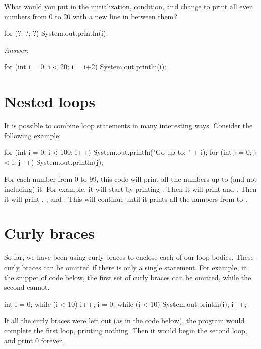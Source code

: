 \begin{example}
What would you put in the initialization, condition, and change to print all
even numbers from 0 to 20 with a new line in between them?

\begin{code}
for (?; ?; ?)
{
    System.out.println(i);
}
\end{code}

\emph{Answer}:
\begin{code}
for (int i = 0; i < 20; i = i+2)
{
    System.out.println(i);
}
\end{code}
\end{example}

\section{Nested loops}
It is possible to combine loop statements in many interesting ways. Consider the following example:

\begin{code}
for (int i = 0; i < 100; i++)
{
    System.out.println("Go up to: " + i);
    for (int j = 0; j < i; j++)
    {
        System.out.println(j);
    }
}
\end{code}

\noindent For each number from 0 to 99, this code will print all the numbers up
to (and not including) it.  For example, it will start by printing . Then it will print 
and .  Then it will print , , and .  This will continue
until it prints all the numbers from  to .

\section{Curly braces}
So far, we have been using curly braces to enclose each of our loop bodies. These curly braces can be omitted if there is only a single statement. For example, in the snippet of code below, the first set of curly braces can be omitted, while the second cannot.

\begin{code}
int i = 0;
while (i < 10)
{
    i++;
}
i = 0;
while (i < 10)
{
    System.out.println(i);
    i++;
}
\end{code}

\noindent If all the curly braces were left out (as in the code below), the
program would complete the first loop, printing nothing. Then it would begin the
second loop, and print 0 forever..

